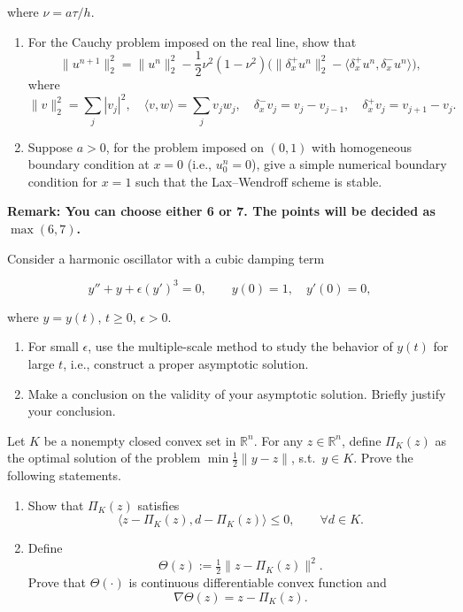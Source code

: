 \documentclass[11pt,a4paper]{article}
\newcommand{\examstatement}[1]{%
  \par\addvspace{0.85em}%
  \noindent{\bfseries #1}\par\nobreak\addvspace{0.28em}%
}
\begin{document}
where \(\nu = a\tau/h\).
\begin{enumerate}[label=(\roman*)]
    \item For the Cauchy problem imposed on the real line, show that
    \[
    \|u^{n+1}\|_{2}^{2} = \|u^{n}\|_{2}^{2} - \frac12 \nu^{2}(1-\nu^{2}) \bigl( \|\delta_{x}^{+} u^{n}\|_{2}^{2} - \langle \delta_{x}^{+} u^{n}, \delta_{x}^{-} u^{n} \rangle \bigr),
    \]
    where
    \[
    \|v\|_{2}^{2} = \sum_{j} |v_{j}|^{2}, \quad \langle v, w \rangle = \sum_{j} v_{j} w_{j}, \quad \delta_{x}^{-} v_{j} = v_{j} - v_{j-1}, \quad \delta_{x}^{+} v_{j} = v_{j+1} - v_{j}.
    \]
    \item Suppose \(a > 0\), for the problem imposed on \((0, 1)\) with homogeneous boundary condition at \(x = 0\) (i.e., \(u_{0}^{n} = 0\)), give a simple numerical boundary condition for \(x = 1\) such that the Lax--Wendroff scheme is stable.
\end{enumerate}

\noindent\textbf{Remark: You can choose either 6 or 7. The points will be decided as \(\max(6,7)\).}

\examstatement{Problem 6. [20 points]}
Consider a harmonic oscillator with a cubic damping term

\[
y'' + y + \epsilon (y')^{3} = 0, \qquad y(0) = 1,\quad y'(0) = 0,
\]

where \(y = y(t)\), \(t \ge 0\), \(\epsilon > 0\).
\begin{enumerate}[label=(\roman*)]
    \item For small \(\epsilon\), use the multiple-scale method to study the behavior of \(y(t)\) for large \(t\), i.e., construct a proper asymptotic solution.
    \item Make a conclusion on the validity of your asymptotic solution. Briefly justify your conclusion.
\end{enumerate}

\examstatement{Problem 7. [20 points]}
Let \(K\) be a nonempty closed convex set in \(\mathbb{R}^{n}\). For any \(z \in \mathbb{R}^{n}\), define \(\Pi_{K}(z)\) as the optimal solution of the problem \(\min \tfrac12 \|y - z\|\), s.t.\ \(y \in K\). Prove the following statements.
\begin{enumerate}[label=(\roman*)]
    \item Show that \(\Pi_{K}(z)\) satisfies
    \[
    \langle z - \Pi_{K}(z), d - \Pi_{K}(z) \rangle \le 0, \qquad \forall d \in K.
    \]
    \item Define
    \[
    \Theta(z) := \tfrac12 \|z - \Pi_{K}(z)\|^{2}.
    \]
    Prove that \(\Theta(\cdot)\) is continuous differentiable convex function and
    \[
    \nabla \Theta(z) = z - \Pi_{K}(z).
    \]
\end{enumerate}
\end{document}
